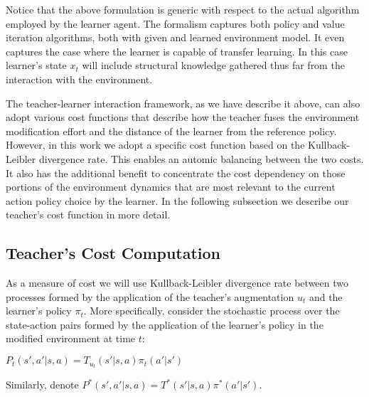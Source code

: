 \documentclass[letterpaper]{aamas2009}
\begin{document}
Notice that the above formulation is generic with respect to the
actual algorithm employed by the learner agent. The formalism captures
both policy and value iteration algorithms, both with given and
learned environment model. It even captures the case where the learner
is capable of transfer learning. In this case learner's state $x_t$
will include structural knowledge gathered thus far from the
interaction with the environment. 

The teacher-learner interaction framework, as we have describe it
above, can also adopt various cost functions that describe how the
teacher fuses the environment modification effort and the distance of
the learner from the reference policy. However, in this work we adopt
a specific cost function based on the Kullback-Leibler divergence
rate. This enables an automic balancing between the two costs. It also
has the additional benefit to concentrate the cost dependency on those
portions of the environment dynamics that are most relevant to the
current action policy choice by the learner. In the following
subsection we describe our teacher's cost function in more detail.

\subsection{Teacher's Cost Computation}
As a measure of cost we will use Kullback-Leibler divergence rate
between two processes formed by the application of the teacher's
augmentation $u_t$ and the learner's policy $\pi_t$. More specifically,
consider the stochastic process over the state-action pairs formed by
the application of the learner's policy in the modified environment at
time $t$: \\
\centerline{$
P_t(s',a'|s,a)=T_{u_t}(s'|s,a)\pi_t(a'|s')
$}

Similarly, denote $P^*(s',a'|s,a)=T^*(s'|s,a)\pi^*(a'|s')$.
\end{document}
